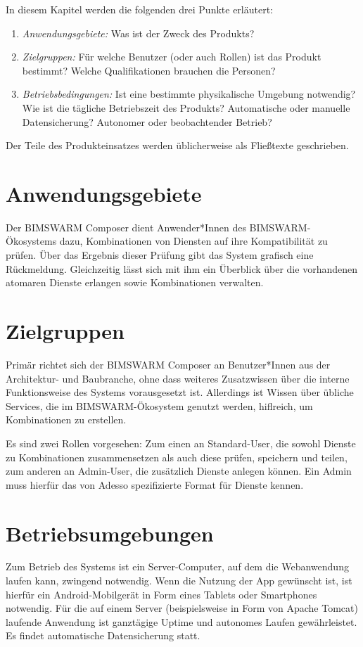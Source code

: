 \begin{tcolorbox}
In diesem Kapitel werden die folgenden drei Punkte erläutert:
\begin{enumerate}
	\item \textit{Anwendungsgebiete:} Was ist der Zweck des Produkts?
	\item \textit{Zielgruppen:} Für welche Benutzer (oder auch Rollen) ist das Produkt bestimmt?
	Welche Qualifikationen brauchen die Personen?
	\item \textit{Betriebsbedingungen:} Ist eine bestimmte physikalische Umgebung notwendig? 
	Wie ist die tägliche Betriebszeit des Produkts? 
	Automatische oder manuelle Datensicherung? 
	Autonomer oder beobachtender Betrieb?
\end{enumerate}

\noindent Der Teile des Produkteinsatzes werden üblicherweise als Fließtexte geschrieben.
\end{tcolorbox}
\section*{Anwendungsgebiete}
Der BIMSWARM Composer dient Anwender*Innen des BIMSWARM-Ökosystems dazu, Kombinationen von Diensten auf ihre Kompatibilität zu prüfen. Über das Ergebnis dieser Prüfung gibt das System grafisch eine Rückmeldung. Gleichzeitig lässt sich mit ihm ein Überblick über die vorhandenen atomaren Dienste erlangen sowie Kombinationen verwalten. 

\section*{Zielgruppen}

Primär richtet sich der BIMSWARM Composer an Benutzer*Innen aus der Architektur- und Baubranche, ohne dass weiteres Zusatzwissen über die interne Funktionsweise des Systems vorausgesetzt ist. Allerdings ist Wissen über übliche Services, die im BIMSWARM-Ökosystem genutzt werden, hiflreich, um Kombinationen zu erstellen.

Es sind zwei Rollen vorgesehen: Zum einen an Standard-User, die sowohl Dienste zu Kombinationen zusammensetzen als auch diese prüfen, speichern und teilen, zum anderen an Admin-User, die zusätzlich Dienste anlegen können. Ein Admin muss hierfür das von Adesso spezifizierte Format für Dienste kennen.

\section*{Betriebsumgebungen}

Zum Betrieb des Systems ist ein Server-Computer, auf dem die Webanwendung laufen kann, zwingend notwendig. Wenn die Nutzung der App gewünscht ist, ist hierfür ein Android-Mobilgerät in Form eines Tablets oder Smartphones notwendig. Für die auf einem Server (beispielsweise in Form von Apache Tomcat) laufende Anwendung ist ganztägige Uptime und autonomes Laufen gewährleistet. Es findet automatische Datensicherung statt.




